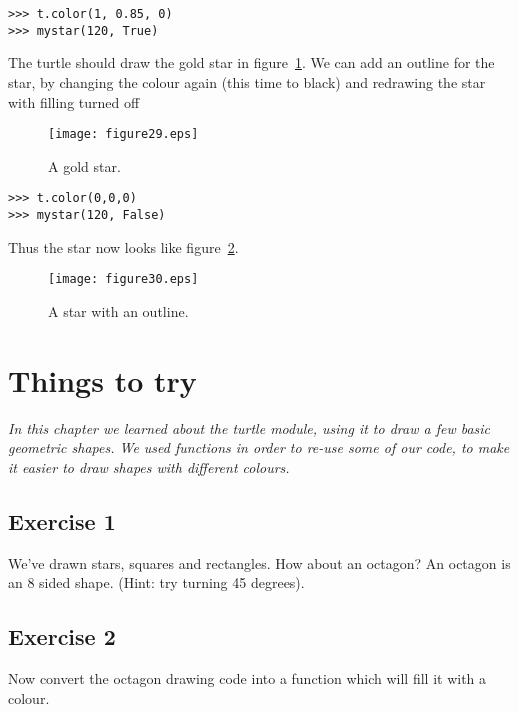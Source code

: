 \begin{Verbatim}[frame=single]
>>> t.color(1, 0.85, 0)
>>> mystar(120, True)
\end{Verbatim}

\noindent
The turtle should draw the gold star in figure~\ref{fig29}. We can add an outline for the star, by changing the colour again (this time to black) and redrawing the star with filling turned off

\begin{figure}
\begin{center}
\texttt{[image: figure29.eps]}
\end{center}
\caption{A gold star.}\label{fig29}
\end{figure}

\begin{Verbatim}[frame=single]
>>> t.color(0,0,0)
>>> mystar(120, False)
\end{Verbatim}

\noindent
Thus the star now looks like figure~\ref{fig30}.

\begin{figure}
\begin{center}
\texttt{[image: figure30.eps]}
\end{center}
\caption{A star with an outline.}\label{fig30}
\end{figure}

\section{Things to try}

\emph{In this chapter we learned about the turtle module, using it to draw a few basic geometric shapes. We used functions in order to re-use some of our code, to make it easier to draw shapes with different colours.}

\subsection*{Exercise 1}
We've drawn stars, squares and rectangles.  How about an octagon?  An octagon is an 8 sided shape.
(Hint: try turning 45 degrees).

\subsection*{Exercise 2}
Now convert the octagon drawing code into a function which will fill it with a colour.

\newpage

